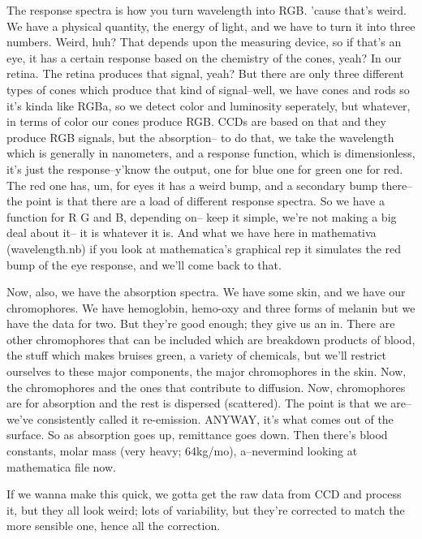 The response spectra is how you turn wavelength into RGB. 'cause that's weird. We have a physical quantity, the energy of light, and we have to turn it into three numbers. Weird, huh? That depends upon the measuring device, so if that's an eye, it has a certain response based on the chemistry of the cones, yeah? In our retina. The retina produces that signal, yeah? But there are only three different types of cones which produce that kind of signal--well, we have cones and rods so it's kinda like RGBa, so we detect color and luminosity seperately, but whatever, in terms of color our cones produce RGB. CCDs are based on that and they produce RGB signals, but the absorption-- to do that, we take the wavelength which is generally in nanometers, and a response function, which is dimensionless, it's just the response--y'know the output, one for blue one for green one for red. The red one has, um, for eyes it has a weird bump, and a secondary bump there--the point is that there are a load of different response spectra. So we have a function for R G and B, depending on-- keep it simple, we're not making a big deal about it-- it is whatever it is. And what we have here in mathemativa (wavelength.nb) if you look at mathematica's graphical rep it simulates the red bump of the eye response, and we'll come back to that.

Now, also, we have the absorption spectra. We have some skin, and we have our chromophores. We have hemoglobin, hemo-oxy and three forms of melanin but we have the data for two. But they're good enough; they give us an in. There are other chromophores that can be included which are breakdown products of blood, the stuff which makes bruises green, a variety of chemicals, but we'll restrict ourselves to these major components, the major chromophores in the skin. Now, the chromophores and the ones that contribute to diffusion. Now, chromophores are for absorption and the rest is dispersed (scattered). The point is that we are--we've consistently called it re-emission. ANYWAY, it's what comes out of the surface. So as absorption goes up, remittance goes down. Then there's blood constants, molar mass (very heavy; 64kg/mo), a--nevermind looking at mathematica file now.

If we wanna make this quick, we gotta get the raw data from CCD and process it, but they all look weird; lots of variability, but they're corrected to match the more sensible one, hence all the correction.








